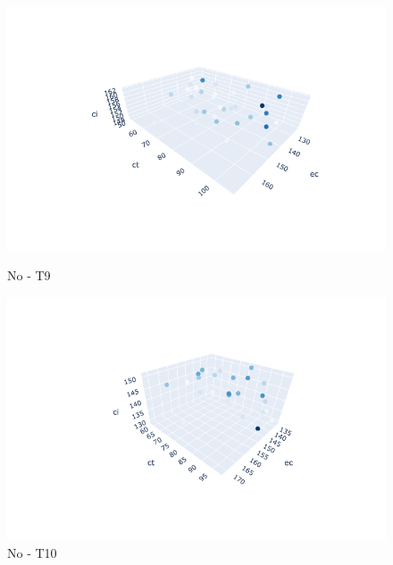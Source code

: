 \documentclass{hust}
\begin{document}
\begin{itemize}
	\begin{figure}[H]
		\begin{minipage}{0.5\textwidth}
			\centering
			\includegraphics[width=1.2\linewidth]{images/no-dem9.png}
			\caption{No - T9}\label{fig:nsga-ii-no-dem9}
		\end{minipage}\hfill
		\begin{minipage}{0.5\textwidth}
			\centering
			\includegraphics[width=1.2\linewidth]{images/no-dem10.png}
			\caption{No - T10}\label{fig:nsga-ii-no-dem10}
		\end{minipage}
	\end{figure}


\end{itemize}
\end{document}
